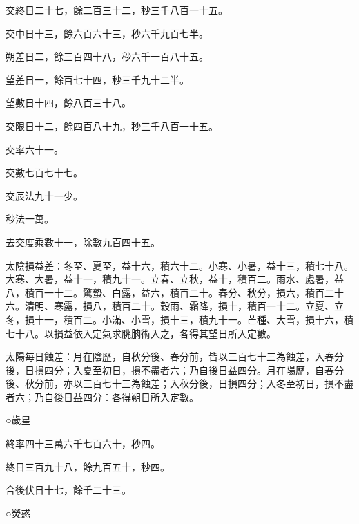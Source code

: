 \begin{pinyinscope}
 交終日二十七，餘二百三十二，秒三千八百一十五。



 交中日十三，餘六百六十三，秒六千九百七半。



 朔差日二，餘三百四十八，秒六千一百八十五。



 望差日一，餘百七十四，秒三千九十二半。



 望數日十四，餘八百三十八。



 交限日十二，餘四百八十九，秒三千八百一十五。



 交率六十一。



 交數七百七十七。



 交辰法九十一少。



 秒法一萬。



 去交度乘數十一，除數九百四十五。



 太陰損益差：冬至、夏至，益十六，積六十二。小寒、小暑，益十三，積七十八。大寒、大暑，益十一，積九十一。立春、立秋，益十，積百二。雨水、處暑，益八，積百一十二。驚蟄、白露，益六，積百二十。春分、秋分，損六，積百二十六。清明、寒露，損八，積百二十。穀雨、霜降，損十，積百一十二。立夏、立冬，損十一，積百二。小滿、小雪，損十三，積九十一。芒種、大雪，損十六，積七十八。以損益依入定氣求朓朒術入之，各得其望日所入定數。



 太陽每日蝕差：月在陰歷，自秋分後、春分前，皆以三百七十三為蝕差，入春分後，日損四分；入夏至初日，損不盡者六；乃自後日益四分。月在陽歷，自春分後、秋分前，亦以三百七十三為蝕差；入秋分後，日損四分；入冬至初日，損不盡者六；乃自後日益四分：各得朔日所入定數。



 ○歲星



 終率四十三萬六千七百六十，秒四。



 終日三百九十八，餘九百五十，秒四。



 合後伏日十七，餘千二十三。



 ○熒惑




\end{pinyinscope}
